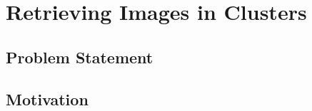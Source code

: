 \section{Retrieving Images in Clusters}
\label{sec_einleitung}


\subsection{Problem Statement}

\subsection{Motivation}


